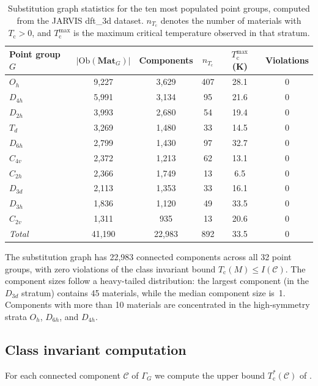 \documentclass[12pt,a4paper]{article}
\theoremstyle{plain}
\theoremstyle{definition}
\theoremstyle{remark}
\newcommand{\Tc}{T_{\mathrm{c}}}
\newcommand{\MatlG}{\mathbf{Mat}_G}
\newcommand{\Ob}{\mathrm{Ob}}
\begin{document}
\begin{table}[H]
\centering
\caption{Substitution graph statistics for the ten most populated point
groups, computed from the JARVIS dft\_3d dataset.  $n_{\Tc}$ denotes
the number of materials with $\Tc > 0$, and $\Tc^{\max}$ is the maximum
critical temperature observed in that stratum.}
\label{tab:graph-stats}
\begin{tabular}{@{}lccccc@{}}
\toprule
Point group $G$ & $|\Ob(\MatlG)|$ & Components &
  $n_{\Tc}$ & $\Tc^{\max}$ (K) & Violations \\
\midrule
$O_h$     & 9{,}227 & 3{,}629 & 407 & 28.1 & 0 \\
$D_{4h}$  & 5{,}991 & 3{,}134 &  95 & 21.6 & 0 \\
$D_{2h}$  & 3{,}993 & 2{,}680 &  54 & 19.4 & 0 \\
$T_d$     & 3{,}269 & 1{,}480 &  33 & 14.5 & 0 \\
$D_{6h}$  & 2{,}799 & 1{,}430 &  97 & 32.7 & 0 \\
$C_{4v}$  & 2{,}372 & 1{,}213 &  62 & 13.1 & 0 \\
$C_{2h}$  & 2{,}366 & 1{,}749 &  13 &  6.5 & 0 \\
$D_{3d}$  & 2{,}113 & 1{,}353 &  33 & 16.1 & 0 \\
$D_{3h}$  & 1{,}836 & 1{,}120 &  49 & 33.5 & 0 \\
$C_{2v}$  & 1{,}311 &    935  &  13 & 20.6 & 0 \\
\midrule
\emph{Total} & 41{,}190 & 22{,}983 & 892 & 33.5 & 0 \\
\bottomrule
\end{tabular}
\end{table}

\noindent
The substitution graph has 22{,}983 connected components across all 32
point groups, with zero violations of the class invariant bound
$\Tc(M) \leq I(\mathcal{C})$.  The component sizes follow a heavy-tailed
distribution: the largest component (in the $D_{3d}$ stratum) contains 45
materials, while the median component size is~1.  Components with more than
10 materials are concentrated in the high-symmetry strata $O_h$, $D_{6h}$,
and $D_{4h}$.

\subsection{Class invariant computation}

For each connected component $\mathcal{C}$ of $\Gamma_G$ we compute the
upper bound $\Tc^*(\mathcal{C})$ of .
\end{document}
